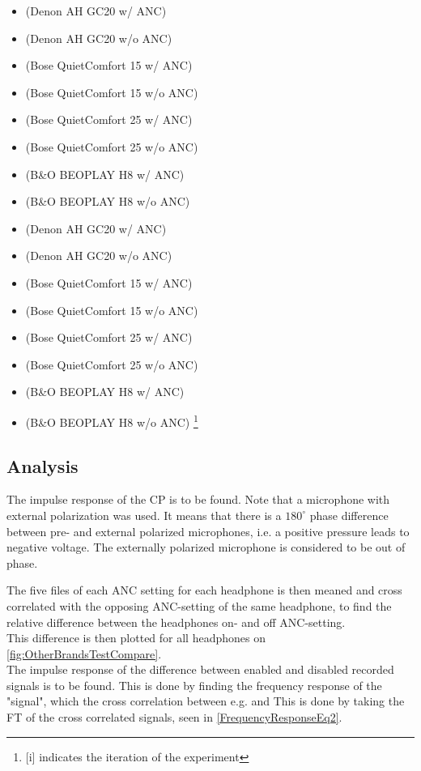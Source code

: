 \begin{itemize}
	\item {}			(Denon AH GC20 w/ ANC)
	\item {}		(Denon AH GC20 w/o ANC)
	\item {}		(Bose QuietComfort 15 w/ ANC)
	\item {}		(Bose QuietComfort 15 w/o ANC)
	\item {}		(Bose QuietComfort 25 w/ ANC)
	\item {}		(Bose QuietComfort 25 w/o ANC)
	\item {}			(B\&O BEOPLAY H8 w/ ANC)
	\item {}			(B\&O BEOPLAY H8 w/o ANC)
	\item {}		(Denon AH GC20 w/ ANC)
	\item {}		(Denon AH GC20 w/o ANC)
	\item {}		(Bose QuietComfort 15 w/ ANC)
	\item {}		(Bose QuietComfort 15 w/o ANC)
	\item {}		(Bose QuietComfort 25 w/ ANC)
	\item {}		(Bose QuietComfort 25 w/o ANC)
	\item {}			(B\&O BEOPLAY H8 w/ ANC)
	\item {}		(B\&O BEOPLAY H8 w/o ANC)
	\footnote{[i] indicates the iteration of the experiment}
\end{itemize}


\subsection{Analysis}
The impulse response of the CP is to be found.
Note that a microphone with external polarization was used. It means that there is a $180^\circ$ phase difference between pre- and external polarized microphones, i.e. a positive pressure leads to negative voltage. The externally polarized microphone is considered to be out of phase. \cite{michandbook}

The five files of each ANC setting for each headphone is then meaned and cross correlated with the opposing ANC-setting of the same headphone, to find the relative difference between the headphones on- and off ANC-setting.\\
This difference is then plotted for all headphones on \autoref{fig:OtherBrandsTestCompare}.
\\
The impulse response of the difference between enabled and disabled recorded signals is to be found.
This is done by finding the frequency response of the "signal", which the cross correlation between e.g.  and  This is done by taking the FT of the cross correlated signals, seen in \autoref{FrequencyResponseEq2}.


